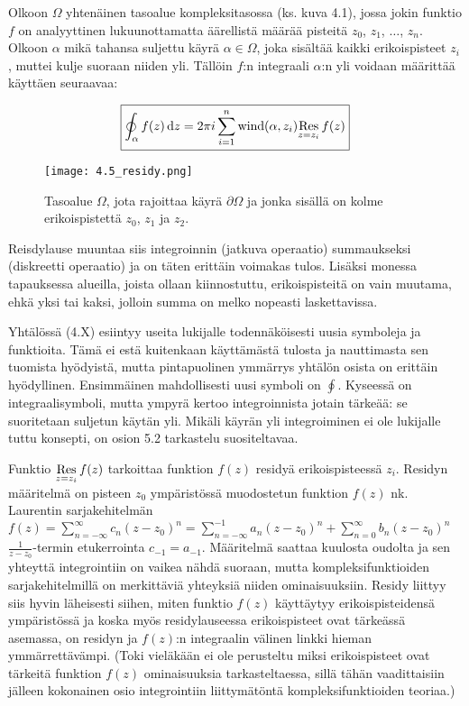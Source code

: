 \documentclass[../integrointiopas.tex]{subfiles}
\begin{document}
	\begin{theorem}
		Olkoon $\Omega$ yhtenäinen tasoalue kompleksitasossa (ks. kuva 4.1), jossa jokin funktio $f$ on analyyttinen lukuunottamatta äärellistä määrää pisteitä $z_0$, $z_1$, $\dots$, $z_n$. Olkoon $\alpha$ mikä tahansa suljettu käyrä $\alpha \in \Omega$, joka sisältää kaikki erikoispisteet $z_i$, muttei kulje suoraan niiden yli. Tällöin $f$:n integraali $\alpha$:n yli voidaan määrittää käyttäen seuraavaa:
		
		\begin{equation}
			\boxed{\oint_{\alpha}f(z)\odif{z} = 2\pi i\sum_{i = 1}^{n}\wind(\alpha, z_i)\res{z = z_i}f(z)}
		\end{equation} 
	\end{theorem}

	\begin{figure}[h!]
		\centering
		\texttt{[image: 4.5\_residy.png]}
		\caption{Tasoalue $\Omega$, jota rajoittaa käyrä $\partial\Omega$ ja jonka sisällä on kolme erikoispistettä $z_0$, $z_1$ ja $z_2$.}
	\end{figure}

	Reisdylause muuntaa siis integroinnin (jatkuva operaatio) summaukseksi (diskreetti operaatio) ja on täten erittäin voimakas tulos. Lisäksi monessa tapauksessa alueilla, joista ollaan kiinnostuttu, erikoispisteitä on vain muutama, ehkä yksi tai kaksi, jolloin summa on melko nopeasti laskettavissa.
	
	Yhtälössä (4.X) esiintyy useita lukijalle todennäköisesti uusia symboleja ja funktioita. Tämä ei estä kuitenkaan käyttämästä tulosta ja nauttimasta sen tuomista hyödyistä, mutta pintapuolinen ymmärrys yhtälön osista on erittäin hyödyllinen. Ensimmäinen mahdollisesti uusi symboli on $\oint$. Kyseessä on integraalisymboli, mutta ympyrä kertoo integroinnista jotain tärkeää: se suoritetaan suljetun käytän yli. Mikäli käyrän yli integroiminen ei ole lukijalle tuttu konsepti, on osion 5.2 tarkastelu suositeltavaa.
	
	Funktio $\underset{z = z_i}{\mathrm{Res}}\,f(z)$ tarkoittaa funktion $f(z)$ residyä erikoispisteessä $z_i$. Residyn määritelmä on pisteen $z_0$ ympäristössä muodostetun funktion $f(z)$ nk. Laurentin sarjakehitelmän $f(z) = \sum\limits_{n = -\infty}^{\infty}c_n(z - z_0)^{n} = \sum\limits_{n = -\infty}^{-1}a_n(z - z_0)^n + \sum\limits_{n = 0}^{\infty}b_n(z - z_0)^n$ $\frac{1}{z - z_0}$-termin etukerrointa $c_{-1} = a_{-1}$. Määritelmä saattaa kuulosta oudolta ja sen yhteyttä integrointiin on vaikea nähdä suoraan, mutta kompleksifunktioiden sarjakehitelmillä on merkittäviä yhteyksiä niiden ominaisuuksiin. Residy liittyy siis hyvin läheisesti siihen, miten funktio $f(z)$ käyttäytyy erikoispisteidensä ympäristössä ja koska myös residylauseessa erikoispisteet ovat tärkeässä asemassa, on residyn ja $f(z)$:n integraalin välinen linkki hieman ymmärrettävämpi. (Toki vieläkään ei ole perusteltu miksi erikoispisteet ovat tärkeitä funktion $f(z)$ ominaisuuksia tarkasteltaessa, sillä tähän vaadittaisiin jälleen kokonainen osio integrointiin liittymätöntä kompleksifunktioiden teoriaa.)
	
\end{document}
